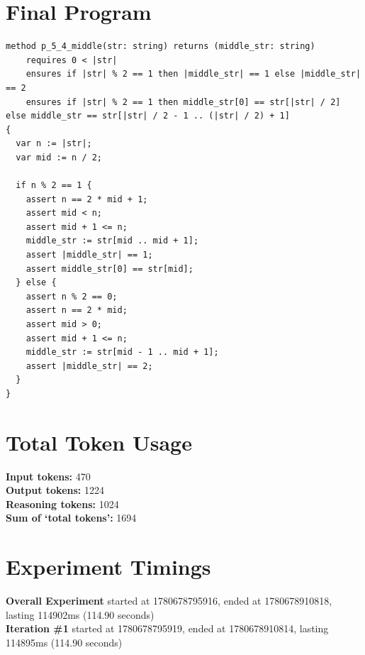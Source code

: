 \documentclass{article}
\begin{document}
\section*{Final Program}
\begin{lstlisting}
method p_5_4_middle(str: string) returns (middle_str: string)
	requires 0 < |str|
	ensures if |str| % 2 == 1 then |middle_str| == 1 else |middle_str| == 2
	ensures if |str| % 2 == 1 then middle_str[0] == str[|str| / 2] else middle_str == str[|str| / 2 - 1 .. (|str| / 2) + 1]
{
  var n := |str|;
  var mid := n / 2;

  if n % 2 == 1 {
    assert n == 2 * mid + 1;
    assert mid < n;
    assert mid + 1 <= n;
    middle_str := str[mid .. mid + 1];
    assert |middle_str| == 1;
    assert middle_str[0] == str[mid];
  } else {
    assert n % 2 == 0;
    assert n == 2 * mid;
    assert mid > 0;
    assert mid + 1 <= n;
    middle_str := str[mid - 1 .. mid + 1];
    assert |middle_str| == 2;
  }
}
\end{lstlisting}
\section*{Total Token Usage}
\textbf{Input tokens: }470
\\\textbf{Output tokens: }1224
\\\textbf{Reasoning tokens: }1024
\\\textbf{Sum of `total tokens': }1694
\section*{Experiment Timings}
\textbf{Overall Experiment} started at 1780678795916, ended at 1780678910818, lasting 114902ms (114.90 seconds)
\\\textbf{Iteration \#1} started at 1780678795919, ended at 1780678910814, lasting 114895ms (114.90 seconds)
\end{document}
